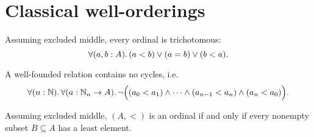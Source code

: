 \documentclass[hott-all.tex]{subfiles}
\begin{document}
\section{Classical well-orderings}
% 
% 
\begin{lem}
  Assuming excluded middle, every ordinal is trichotomous:
  \[ \fall{a,b:A} (a<b) \vee (a=b) \vee (b<a). \]
\end{lem}
% 
% 
% 
\begin{lem}
  A well-founded relation contains no cycles, i.e.\
  \[ \fall{n:\mathbb{N}}{a:\mathbb{N}_n\to A} \neg\Big((a_0<a_1) \wedge \dots \wedge (a_{n-1}<a_n)\wedge (a_n<a_0)\Big). \]
\end{lem}
% 
% 
\begin{thm}
  Assuming excluded middle, $(A,<)$ is an ordinal if and only if every nonempty subset $B\subseteq A$ has a least element.
\end{thm}
\end{document}
